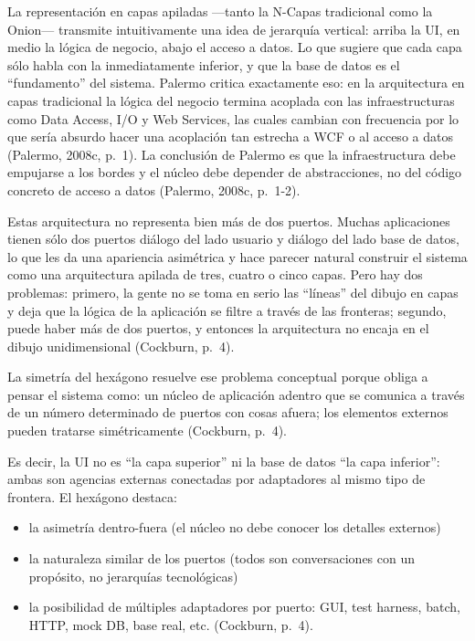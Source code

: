 \documentclass[12pt,a4paper]{article}
\begin{document}
La representación en capas apiladas ---tanto la N-Capas tradicional como la Onion--- transmite intuitivamente una idea de jerarquía vertical: arriba la UI, en medio la lógica de negocio, abajo el acceso a datos. Lo que sugiere que cada capa sólo habla con la inmediatamente inferior, y que la base de datos es el ``fundamento'' del sistema. Palermo critica exactamente eso: en la arquitectura en capas tradicional la lógica del negocio termina acoplada con las infraestructuras como Data Access, I/O y Web Services, las cuales cambian con frecuencia por lo que sería absurdo hacer una acoplación tan estrecha a WCF o al acceso a datos (Palermo, 2008c, p.~1). La conclusión de Palermo es que la infraestructura debe empujarse a los bordes y el núcleo debe depender de abstracciones, no del código concreto de acceso a datos (Palermo, 2008c, p.~1-2).

Estas arquitectura no representa bien más de dos puertos. Muchas aplicaciones tienen sólo dos puertos diálogo del lado usuario y diálogo del lado base de datos, lo que les da una apariencia asimétrica y hace parecer natural construir el sistema como una arquitectura apilada de tres, cuatro o cinco capas. Pero hay dos problemas: primero, la gente no se toma en serio las ``líneas'' del dibujo en capas y deja que la lógica de la aplicación se filtre a través de las fronteras; segundo, puede haber más de dos puertos, y entonces la arquitectura no encaja en el dibujo unidimensional (Cockburn, p.~4).

La simetría del hexágono resuelve ese problema conceptual porque obliga a pensar el sistema como: un núcleo de aplicación adentro que se comunica a través de un número determinado de puertos con cosas afuera; los elementos externos pueden tratarse simétricamente (Cockburn, p.~4).

Es decir, la UI no es ``la capa superior'' ni la base de datos ``la capa inferior'': ambas son agencias externas conectadas por adaptadores al mismo tipo de frontera. El hexágono destaca:

\begin{itemize}[label=$\cdot$]
  \item la asimetría dentro-fuera (el núcleo no debe conocer los detalles externos)
  \item la naturaleza similar de los puertos (todos son conversaciones con un propósito, no jerarquías tecnológicas)
  \item la posibilidad de múltiples adaptadores por puerto: GUI, test harness, batch, HTTP, mock DB, base real, etc. (Cockburn, p.~4).
\end{itemize}
\end{document}
